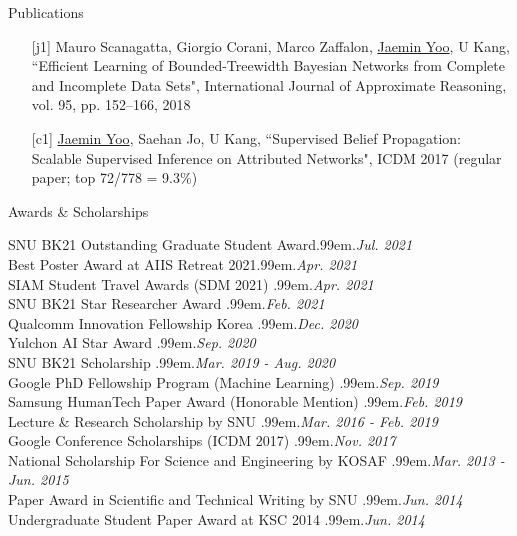 \documentclass{resume} %
\makeatletter
\newcommand \Dotfill {\leavevmode \cleaders \hb@xt@ .99em{\hss .\hss }\hfill \kern \z@}
\makeatother
\begin{document}
\begin{rSection}{Publications}
\begin{enumerate}
	\item[{[j1]}] Mauro Scanagatta, Giorgio Corani, Marco Zaffalon, \underline{Jaemin Yoo}, U Kang, ``Efficient Learning of Bounded-Treewidth Bayesian Networks from Complete and Incomplete Data Sets", International Journal of Approximate Reasoning, vol. 95, pp. 152--166, 2018

	\item[{[c1]}] \underline{Jaemin Yoo}, Saehan Jo, U Kang, ``Supervised Belief Propagation: Scalable Supervised Inference on Attributed Networks", ICDM 2017 (regular paper; top 72/778 = 9.3\%)

\end{enumerate}
\end{rSection}


\begin{rSection}{Awards \& Scholarships}

SNU BK21 Outstanding Graduate Student Award\smallskip \Dotfill \emph{Jul. 2021} \\ 
Best Poster Award at AIIS Retreat 2021\smallskip \Dotfill \emph{Apr. 2021} \\ 
SIAM Student Travel Awards (SDM 2021) \smallskip \Dotfill \emph{Apr. 2021} \\ 
SNU BK21 Star Researcher Award \smallskip \Dotfill \emph{Feb. 2021} \\ 
Qualcomm Innovation Fellowship Korea \smallskip \Dotfill \emph{Dec. 2020} \\ 
Yulchon AI Star Award \smallskip \Dotfill \emph{Sep. 2020} \\ 
SNU BK21 Scholarship \smallskip \Dotfill \emph{Mar. 2019 - Aug. 2020} \\ 
Google PhD Fellowship Program (Machine Learning) \smallskip \Dotfill \emph{Sep. 2019} \\ 
Samsung HumanTech Paper Award (Honorable Mention) \smallskip \Dotfill \emph{Feb. 2019} \\ 
Lecture \& Research Scholarship by SNU \smallskip \Dotfill \emph{Mar. 2016 - Feb. 2019} \\ 
Google Conference Scholarships (ICDM 2017) \smallskip \Dotfill \emph{Nov. 2017} \\ 
National Scholarship For Science and Engineering by KOSAF \smallskip \Dotfill \emph{Mar. 2013 - Jun. 2015} \\
Paper Award in Scientific and Technical Writing by SNU \smallskip \Dotfill \emph{Jun. 2014} \\ 
Undergraduate Student Paper Award at KSC 2014 \smallskip \Dotfill \emph{Jun. 2014}

\end{rSection}
\end{document}

